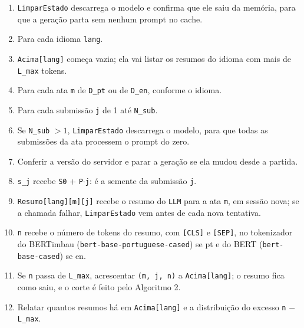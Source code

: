 \documentclass[12pt]{article}
\begin{document}
\begin{enumerate}
\item \texttt{LimparEstado} descarrega o modelo e confirma que ele saiu da
  memória, para que a geração parta sem nenhum prompt no cache.
\item Para cada idioma \texttt{lang}.
\item \texttt{Acima[lang]} começa vazia; ela vai listar os resumos do idioma
  com mais de \texttt{L\_max} tokens.
\item Para cada ata \texttt{m} de \texttt{D\_pt} ou de \texttt{D\_en},
  conforme o idioma.
\item Para cada submissão \texttt{j} de 1 até \texttt{N\_sub}.
\item Se \texttt{N\_sub} $> 1$, \texttt{LimparEstado} descarrega o modelo, para
  que todas as submissões da ata processem o prompt do zero.
\item Conferir a versão do servidor e parar a geração se ela mudou desde a
  partida.
\item \texttt{s\_j} recebe \texttt{S0} + \texttt{P}$\cdot$\texttt{j}: é a
  semente da submissão \texttt{j}.
\item \texttt{Resumo[lang][m][j]} recebe o resumo do \texttt{LLM} para a ata
  \texttt{m}, em sessão nova; se a chamada falhar, \texttt{LimparEstado} vem
  antes de cada nova tentativa.
\item \texttt{n} recebe o número de tokens do resumo, com \texttt{[CLS]} e
  \texttt{[SEP]}, no tokenizador do BERTimbau
  (\texttt{bert-base-portuguese-cased}) se pt e do BERT
  (\texttt{bert-base-cased}) se en.
\item Se \texttt{n} passa de \texttt{L\_max}, acrescentar \texttt{(m, j, n)} a
  \texttt{Acima[lang]}; o resumo fica como saiu, e o corte é feito pelo
  Algoritmo 2.
\item Relatar quantos resumos há em \texttt{Acima[lang]} e a distribuição do
  excesso \texttt{n} $-$ \texttt{L\_max}.
\end{enumerate}
\end{document}
